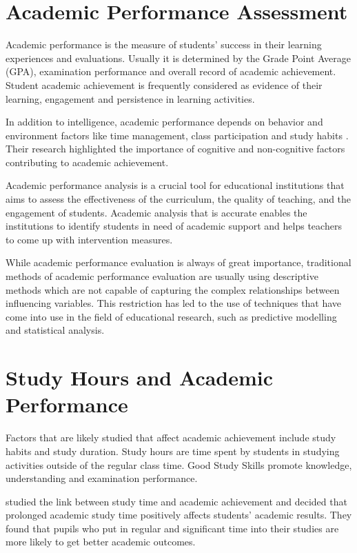 \documentclass[12pt]{report}
\begin{document}
	\section{Academic Performance Assessment}
	Academic performance is the measure of students' success in their learning experiences and evaluations. Usually it is determined by the Grade Point Average (GPA), examination performance and overall record of academic achievement. Student academic achievement is frequently considered as evidence of their learning, engagement and persistence in learning activities.
	
	In addition to intelligence, academic performance depends on behavior and environment factors like time management, class participation and study habits \citep{Crede2008}. Their research highlighted the importance of cognitive and non-cognitive factors contributing to academic achievement.
	
	Academic performance analysis is a crucial tool for educational institutions that aims to assess the effectiveness of the curriculum, the quality of teaching, and the engagement of students. Academic analysis that is accurate enables the institutions to identify students in need of academic support and helps teachers to come up with intervention measures.
	
	While academic performance evaluation is always of great importance, traditional methods of academic performance evaluation are usually using descriptive methods which are not capable of capturing the complex relationships between influencing variables. This restriction has led to the use of techniques that have come into use in the field of educational research, such as predictive modelling and statistical analysis.
	\section{Study Hours and Academic Performance}	
	Factors that are likely studied that affect academic achievement include study habits and study duration. Study hours are time spent by students in studying activities outside of the regular class time. Good Study Skills promote knowledge, understanding and examination performance.
	
	\citet{Stine2008} studied the link between study time and academic achievement and decided that prolonged academic study time positively affects students' academic results. They found that pupils who put in regular and significant time into their studies are more likely to get better academic outcomes.
	
\end{document}
